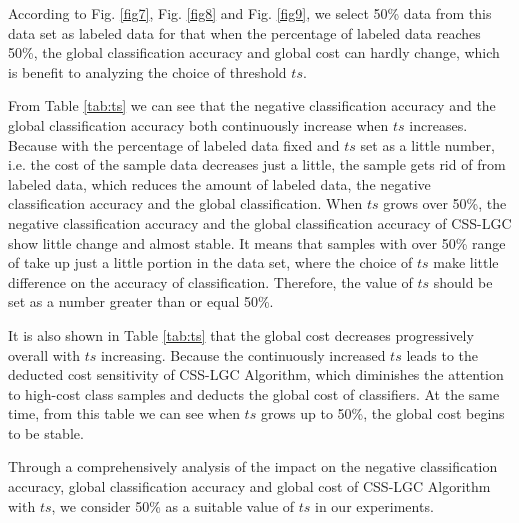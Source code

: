 \documentclass{svjour3}                     %
\begin{document}
According to Fig. \ref{fig7}, Fig. \ref{fig8} and Fig. \ref{fig9}, we select 50\% data from this data set as labeled data for that when the percentage of labeled data reaches 50\%, the global classification accuracy and global cost can hardly change, which is benefit to analyzing the choice of threshold $ts$.

From Table \ref{tab:ts} we can see that the negative classification accuracy and the global classification accuracy both continuously increase when $ts$ increases. Because with the percentage of labeled data fixed and $ts$ set as a little number, i.e. the cost of the sample data decreases just a little, the sample gets rid of from labeled data, which reduces the amount of labeled data, the negative classification accuracy and the global classification. When $ts$ grows over 50\%, the negative classification accuracy and the global classification accuracy of CSS-LGC show little change and almost stable. It means that samples with over 50\% range of take up just a little portion in the data set, where the choice of $ts$ make little difference on the accuracy of classification. Therefore, the value of $ts$ should be set as a number greater than or equal 50\%.

It is also shown in Table \ref{tab:ts} that the global cost decreases progressively overall with $ts$ increasing. Because the continuously increased $ts$ leads to the deducted cost sensitivity of CSS-LGC
Algorithm, which diminishes the attention to high-cost class samples and deducts the global cost of classifiers. At the same time, from this table we can see when $ts$ grows up to 50\%, the global cost begins to be stable. 

Through a comprehensively analysis of the impact on the negative classification accuracy, global classification accuracy and global cost of CSS-LGC Algorithm with $ts$, we consider 50\% as a suitable value of $ts$ in our experiments.
\end{document}
